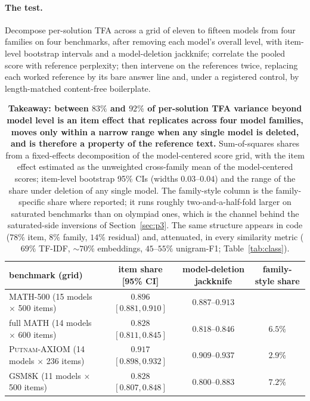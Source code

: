 \documentclass[11pt]{article}
\newcommand{\tfa}{\textsc{TFA}}
\begin{document}
\paragraph{The test.}
Decompose per-solution \tfa{} across a grid of eleven to fifteen models from four families on four benchmarks, after removing each model's overall level, with item-level bootstrap intervals and a model-deletion jackknife; correlate the pooled score with reference perplexity; then intervene on the references twice, replacing each worked reference by its bare answer line and, under a registered control, by length-matched content-free boilerplate.

\begin{table}[tbp]
\centering
\footnotesize
\setlength{\tabcolsep}{3pt}
\begin{tabular}{lccc}
\toprule
benchmark (grid) & item share [95\% CI] & model-deletion jackknife & family-style share \\
\midrule
\textsc{MATH-500} (15 models $\times$ 500 items) & $0.896$ $[0.881, 0.910]$ & $0.887$--$0.913$ & \\
full \textsc{MATH} (14 models $\times$ 600 items) & $0.828$ $[0.811, 0.845]$ & $0.818$--$0.846$ & $6.5\%$ \\
\textsc{Putnam-AXIOM} (14 models $\times$ 236 items) & $0.917$ $[0.898, 0.932]$ & $0.909$--$0.937$ & $2.9\%$ \\
\textsc{GSM8K} (11 models $\times$ 500 items) & $0.828$ $[0.807, 0.848]$ & $0.800$--$0.883$ & $7.2\%$ \\
\bottomrule
\end{tabular}
\caption{\textbf{Takeaway: between $83\%$ and $92\%$ of per-solution \tfa{} variance beyond model level is an item effect that replicates across four model families, moves only within a narrow range when any single model is deleted, and is therefore a property of the reference text.}
Sum-of-squares shares from a fixed-effects decomposition of the model-centered score grid, with the item effect estimated as the unweighted cross-family mean of the model-centered scores; item-level bootstrap 95\% CIs (widths $0.03$--$0.04$) and the range of the share under deletion of any single model.
The family-style column is the family-specific share where reported; it runs roughly two-and-a-half-fold larger on saturated benchmarks than on olympiad ones, which is the channel behind the saturated-side inversions of Section~\ref{sec:p3}.
The same structure appears in code ($78\%$ item, $8\%$ family, $14\%$ residual) and, attenuated, in every similarity metric ($69\%$ TF-IDF, $\sim$$70\%$ embeddings, $45$--$55\%$ unigram-F1; Table~\ref{tab:class}).}
\label{tab:decomp}
\end{table}
\end{document}
